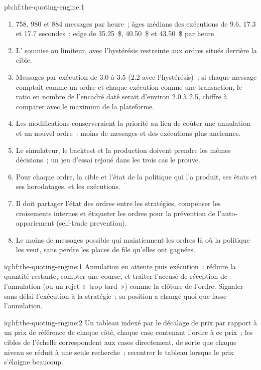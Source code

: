 \begin{solution}{pb:hf:the-quoting-engine:1}
\begin{enumerate}
\item 758, 980 et 884 messages par heure~; âges médians des exécutions de 9.6, 17.3 et 17.7 secondes~; edge de 35.25~\$, 40.50~\$ et 43.50~\$ par heure.
\item L' soumise au limiteur, avec l'hystérésis restreinte aux ordres situés derrière la cible.
\item Messages par exécution de 3.0 à 3.5 (2.2 avec l'hystérésis)~; si chaque message comptait comme un ordre et chaque exécution comme une transaction, le
ratio en nombre de l'encadré daté serait d'environ 2.0 à 2.5, chiffre à comparer avec le maximum de la plateforme.
\item Les modifications conserveraient la priorité au lieu de coûter une annulation et un nouvel ordre~: moins de messages et des exécutions plus anciennes.
\item Le simulateur, le backtest et la production doivent prendre les mêmes décisions~; un jeu d'essai rejoué dans les trois cas le prouve.
\item Pour chaque ordre, la cible et l'état de la politique qui l'a produit, ses états et ses horodatages, et les exécutions.
\item Il doit partager l'état des ordres entre les stratégies, compenser les croisements internes et étiqueter les ordres pour la prévention de l'auto-appariement (self-trade prevention).
\item Le moins de messages possible qui maintiennent les ordres là où la politique les veut, sans perdre les places de file qu'elles ont gagnées.
\end{enumerate}
\end{solution}

\begin{solution}{iq:hf:the-quoting-engine:1}
Annulation en attente puis exécution~: réduire la quantité restante, compter une course, et traiter l'accusé de réception de l'annulation (ou un rejet «~trop tard~») comme la clôture de l'ordre.
Signaler sans délai l'exécution à la stratégie~; sa position a changé quoi que fasse l'annulation.
\end{solution}

\begin{solution}{iq:hf:the-quoting-engine:2}
Un tableau indexé par le décalage de prix par rapport à un prix de référence de chaque côté, chaque case contenant l'ordre à ce prix~; les cibles de l'échelle correspondent aux cases
directement, de sorte que chaque niveau se réduit à une seule recherche~; recentrer le tableau lorsque le prix s'éloigne beaucoup.
\end{solution}

